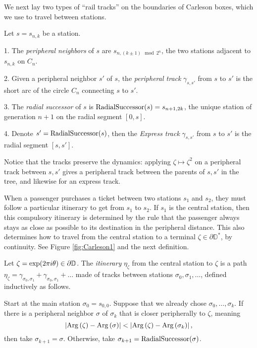 We next lay two types of \enquote{rail tracks} on the boundaries of Carleson boxes, which we use to travel between stations.

\begin{definition}
Let $s=s_{n,k}$ be a station.

1. The \emph{peripheral neighbors} of $s$ are $s_{n,\left(k\pm1\right)\mod2^{n}}$,
the two stations adjacent to $s_{n,k}$ on $C_{n}$.

2. Given a peripheral neighbor $s'$ of $s$, the \emph{peripheral
	track }$\gamma_{s,s'}$ from $s$ to $s'$
is the short arc of the circle $C_{n}$ connecting $s$ to $s'$.

3. The \emph{radial successor} of $s$ is $\operatorname{RadialSuccessor}(s)=s_{n+1,2k}$, the unique station of generation $n+1$ on the radial segment $[0,s]$.

4. Denote $s'=\operatorname{RadialSuccessor}(s)$, then the \emph{Express track} $\gamma_{s,s'}$ from $s$ to $s'$ is the radial segment $[s,s']$.

\end{definition}

Notice that the tracks preserve the dynamics: applying $\zeta\mapsto \zeta^{2}$
on a peripheral track between $s,s'$ gives a peripheral track between the
parents of $s,s'$ in the tree, and likewise for an express track.

When a passenger purchases a ticket between two stations $s_1$ and $s_2$, they must follow a particular itinerary to get from $s_1$ to $s_2$.
If $s_1$ is the central station, then this compulsory itinerary is determined by the rule that the passenger always stays as close as possible to its destination in the peripheral distance. 
This also determines how to travel from the central station to a terminal $\zeta\in \partial \mathbb D^*$, by continuity. See Figure \ref{fig:Carleson1} and the next definition.


\begin{definition}
Let $\zeta=\exp(2\pi i\theta)\in\partial\mathbb{D}$. The \emph{itinerary} $\eta_\zeta$ from the central station to $\zeta$ is a path 
$\eta_\zeta = \gamma _{\sigma_0,\sigma_1} + \gamma_{\sigma_0,\sigma_1}+\ldots$ made of tracks between stations $\sigma_0,\sigma_1,\ldots$, defined inductively as follows.

Start at the main station $\sigma_0=s_{0,0}$. Suppose that we already chose $\sigma_0,\ldots,\sigma_k$. If there is a peripheral neighbor $\sigma$ of $\sigma_k$ that is closer peripherally to $\zeta$, meaning $$\left|\operatorname{Arg}\left(\zeta\right)-\operatorname{Arg}\left(\sigma\right)\right|
< \left|\operatorname{Arg}\left(\zeta\right)-\operatorname{Arg}\left(\sigma_{k}\right)\right|,$$ then take $\sigma_{k+1}=\sigma$. Otherwise, take 
$\sigma_{k+1}=\operatorname{RadialSuccessor}(\sigma)$.

\end{definition} 

